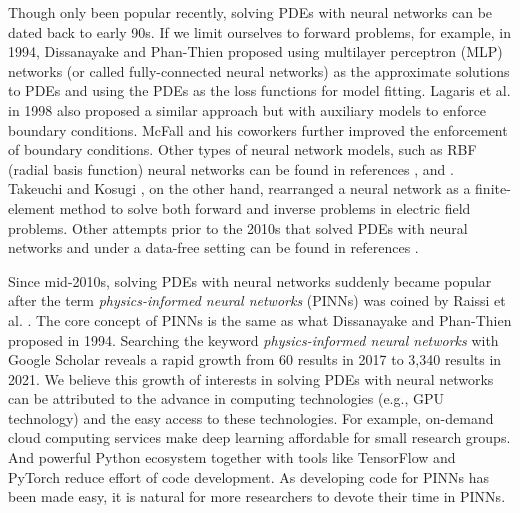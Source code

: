 Though only been popular recently, solving PDEs with neural networks can be dated back to early 90s.
If we limit ourselves to forward problems, for example, in 1994, Dissanayake and Phan-Thien \cite{dissanayake_neural-network-based_1994} proposed using multilayer perceptron (MLP) networks (or called fully-connected neural networks) as the approximate solutions to PDEs and using the PDEs as the loss functions for model fitting.
Lagaris et al. in 1998 \cite{lagaris_artificial_1998} also proposed a similar approach but with auxiliary models to enforce boundary conditions.
McFall and his coworkers \cite{McFall2009,mcfall_solving_2010} further improved the enforcement of boundary conditions.
Other types of neural network models, such as RBF (radial basis function) neural networks can be found in references \cite{li_numerical_2003,mai-duy_numerical_2001,demirkaya_direct_2008}, and \cite{li_integration_2010}.
Takeuchi and Kosugi \cite{takeuchi_neural_1994}, on the other hand, rearranged a neural network as a finite-element method to solve both forward and inverse problems in electric field problems.
Other attempts prior to the 2010s that solved PDEs with neural networks and under a data-free setting can be found in references \cite{yadav_introduction_2015}.

Since mid-2010s, solving PDEs with neural networks suddenly became popular after the term {\it physics-informed neural networks} (PINNs) was coined by Raissi et al. \cite{raissi_physics-informed_2017}.
The core concept of PINNs is the same as what Dissanayake and Phan-Thien proposed in 1994.
Searching the keyword {\it physics-informed neural networks} with Google Scholar reveals a rapid growth from 60 results in 2017 to 3,340 results in 2021.
We believe this growth of interests in solving PDEs with neural networks can be attributed to the advance in computing technologies (e.g., GPU technology) and the easy access to these technologies.
For example, on-demand cloud computing services make deep learning affordable for small research groups.
And powerful Python ecosystem together with tools like TensorFlow and PyTorch reduce effort of code development.
As developing code for PINNs has been made easy, it is natural for more researchers to devote their time in PINNs.


